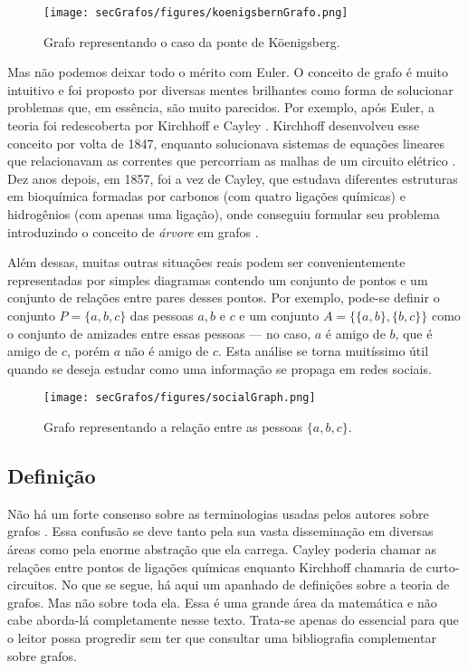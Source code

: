 \begin{figure}[H]
	\begin{center}
		\texttt{[image: secGrafos/figures/koenigsbernGrafo.png]}
	\end{center}
	\caption{Grafo representando o caso da ponte de Köenigsberg.}
	\label{fig:koniGrafo}
\end{figure}

Mas não podemos deixar todo o mérito com Euler. O conceito de grafo é muito intuitivo e foi proposto por diversas mentes brilhantes como forma de solucionar problemas que, em essência, são muito parecidos. Por exemplo, após Euler, a teoria foi redescoberta por Kirchhoff e Cayley \cite{graphTheoryFHarary}. Kirchhoff desenvolveu esse conceito por volta de 1847, enquanto solucionava sistemas de equações lineares que relacionavam as correntes que percorriam as malhas de um circuito elétrico \cite{kirchhoff1847ueber}. Dez anos depois, em 1857, foi a vez de Cayley, que estudava diferentes estruturas em bioquímica formadas por carbonos (com quatro ligações químicas) e hidrogênios (com apenas uma ligação), onde conseguiu formular seu problema introduzindo o conceito de \textit{árvore} em grafos \cite{cayley1897theory}.  

Além dessas, muitas outras situações reais podem ser convenientemente representadas por simples diagramas contendo um conjunto de pontos e um conjunto de relações entre pares desses pontos. Por exemplo, pode-se definir o conjunto $P = \{a,b,c\}$ das pessoas $a, b$ e $c$ e um conjunto $A = \{\{a,b\}, \{b,c\}\}$ como o conjunto de amizades entre essas pessoas --- no caso, $a$ é amigo de $b$, que é amigo de $c$, porém $a$ não é amigo de $c$. 
Esta análise se torna muitíssimo útil quando se deseja estudar como uma informação se propaga em redes sociais.

\begin{figure}[H]
	\begin{center}
		\texttt{[image: secGrafos/figures/socialGraph.png]}
	\end{center}
	\caption{Grafo representando a relação entre as pessoas $\{a, b, c\}$.}
	\label{fig:socialGraph}
\end{figure}

\subsection{Definição}

Não há um forte consenso sobre as terminologias usadas pelos autores sobre grafos \cite{graphTheoryFHarary}. Essa confusão se deve tanto pela sua vasta disseminação em diversas áreas como pela enorme abstração que ela carrega. Cayley poderia chamar as relações entre pontos de ligações químicas enquanto Kirchhoff chamaria de curto-circuitos.
No que se segue, há aqui um apanhado de definições sobre a teoria de grafos. Mas não sobre toda ela. Essa é uma grande área da matemática e não cabe aborda-lá completamente nesse texto. Trata-se apenas do essencial para que o leitor possa progredir sem ter que consultar uma bibliografia complementar sobre grafos.

